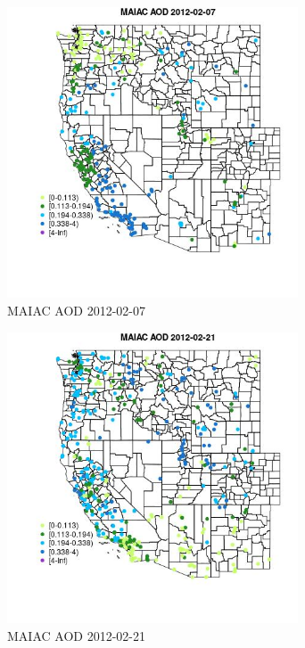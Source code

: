 \begin{figure} 
\centering  
\includegraphics[width=0.77\textwidth]{Code_Outputs/Report_ML_input_PM25_Step4_part_f_de_duplicated_aveswNAs_MapObsMAIAC_AOD2012-02-07.jpg} 
\caption{\label{fig:Report_ML_input_PM25_Step4_part_f_de_duplicated_aveswNAsMapObsMAIAC_AOD2012-02-07}MAIAC AOD 2012-02-07} 
\end{figure} 
 

\begin{figure} 
\centering  
\includegraphics[width=0.77\textwidth]{Code_Outputs/Report_ML_input_PM25_Step4_part_f_de_duplicated_aveswNAs_MapObsMAIAC_AOD2012-02-21.jpg} 
\caption{\label{fig:Report_ML_input_PM25_Step4_part_f_de_duplicated_aveswNAsMapObsMAIAC_AOD2012-02-21}MAIAC AOD 2012-02-21} 
\end{figure} 
 

